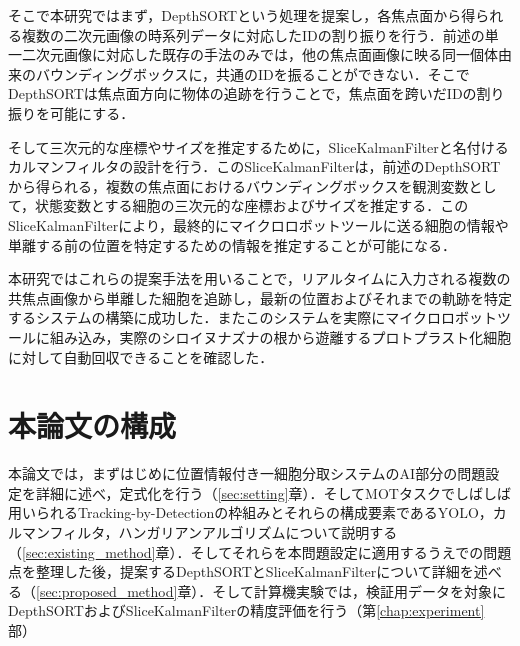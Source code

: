 そこで本研究ではまず，DepthSORTという処理を提案し，各焦点面から得られる複数の二次元画像の時系列データに対応したIDの割り振りを行う．前述の単一二次元画像に対応した既存の手法のみでは，他の焦点面画像に映る同一個体由来のバウンディングボックスに，共通のIDを振ることができない．そこでDepthSORTは焦点面方向に物体の追跡を行うことで，焦点面を跨いだIDの割り振りを可能にする．

そして三次元的な座標やサイズを推定するために，SliceKalmanFilterと名付けるカルマンフィルタの設計を行う．このSliceKalmanFilterは，前述のDepthSORTから得られる，複数の焦点面におけるバウンディングボックスを観測変数として，状態変数とする細胞の三次元的な座標およびサイズを推定する．このSliceKalmanFilterにより，最終的にマイクロロボットツールに送る細胞の情報や単離する前の位置を特定するための情報を推定することが可能になる．

本研究ではこれらの提案手法を用いることで，リアルタイムに入力される複数の共焦点画像から単離した細胞を追跡し，最新の位置およびそれまでの軌跡を特定するシステムの構築に成功した．またこのシステムを実際にマイクロロボットツールに組み込み，実際のシロイヌナズナの根から遊離するプロトプラスト化細胞に対して自動回収できることを確認した．

\section{本論文の構成}
\label{sec:outline}

本論文では，まずはじめに位置情報付き一細胞分取システムのAI部分の問題設定を詳細に述べ，定式化を行う（\ref{sec:setting}章）．そしてMOTタスクでしばしば用いられるTracking-by-Detectionの枠組みとそれらの構成要素であるYOLO，カルマンフィルタ，ハンガリアンアルゴリズムについて説明する（\ref{sec:existing_method}章）．そしてそれらを本問題設定に適用するうえでの問題点を整理した後，提案するDepthSORTとSliceKalmanFilterについて詳細を述べる（\ref{sec:proposed_method}章）．そして計算機実験では，検証用データを対象にDepthSORTおよびSliceKalmanFilterの精度評価を行う（第\ref{chap:experiment}部）